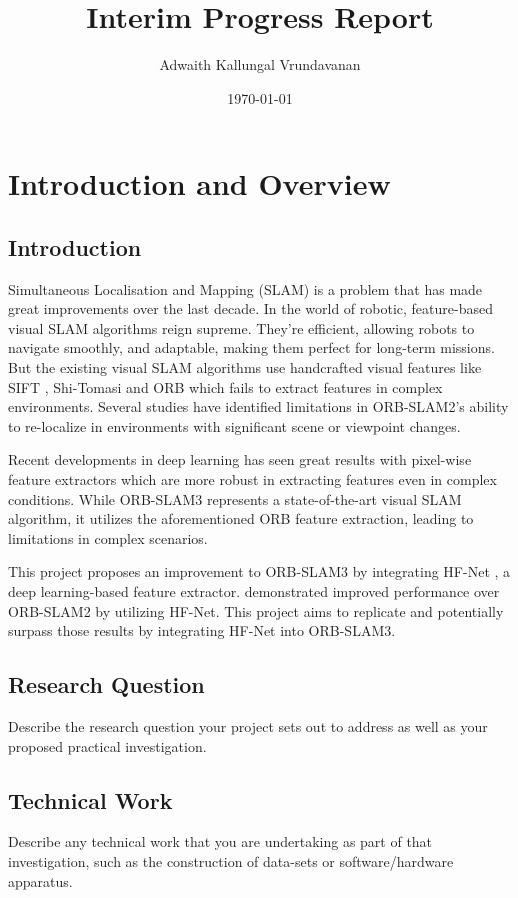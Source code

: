 \documentclass[a4paper,12pt]{article}
\title{Interim Progress Report}
\author{Adwaith Kallungal Vrundavanan}
\date{\today}
\begin{document}
	
	
	
	\tableofcontents
	\newpage
	
	\section{Introduction and Overview}
	\subsection{Introduction}
	Simultaneous Localisation and Mapping (SLAM) is a problem that has made great improvements over the last decade. In the world of robotic,
	feature-based visual SLAM algorithms reign supreme. They're efficient, allowing robots to navigate smoothly, and adaptable, making them perfect for long-term missions. But the existing visual SLAM algorithms use handcrafted visual features like SIFT \citep{lowe2004distinctive}, Shi-Tomasi \citep{323794} and ORB \citep{ethan2011orb} which fails to extract features in complex environments. Several studies \citep{mur2017orb,shi2020we} have identified limitations in ORB-SLAM2's ability to re-localize in environments with significant scene or viewpoint changes.
	
	Recent developments in deep learning has seen great results with pixel-wise feature extractors \citep{detone2018superpoint,dusmanu2019d2,tang2019gcnv2} which are more robust in extracting features even in complex conditions. While ORB-SLAM3 \citep{campos2021orb} represents a state-of-the-art visual SLAM algorithm, it utilizes the aforementioned ORB feature extraction, leading to limitations in complex scenarios.
	
	This project proposes an improvement to ORB-SLAM3 by integrating HF-Net \citep{sarlin2019coarse}, a deep learning-based feature extractor. \textcite{li2020dxslam} demonstrated improved performance over ORB-SLAM2 by utilizing HF-Net. This project aims to replicate and potentially surpass those results by integrating HF-Net into ORB-SLAM3.
	\subsection{Research Question}
	Describe the research question your project sets out to address as well as your proposed practical investigation.
	
	\subsection{Technical Work}
	Describe any technical work that you are undertaking as part of that investigation, such as the construction of data-sets or software/hardware apparatus.
	
\end{document}
